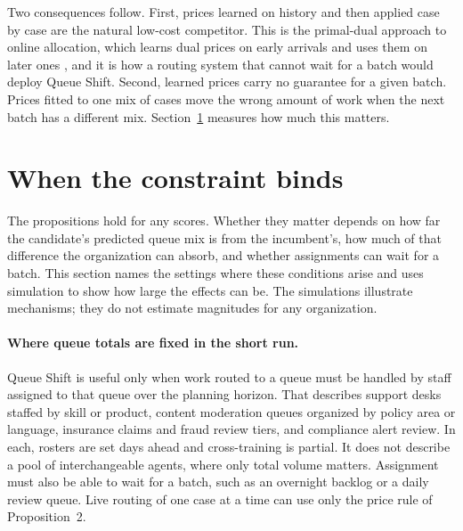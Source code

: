 \documentclass[11pt]{article}
\begin{document}
Two consequences follow. First, prices learned on history and then applied case by case are the
natural low-cost competitor. This is the primal-dual approach to online allocation, which learns
dual prices on early arrivals and uses them on later ones \citep{devanur2009adwords,agrawal2014online},
and it is how a routing system that cannot wait for a batch would deploy Queue Shift. Second,
learned prices carry no guarantee for a given batch. Prices fitted to one mix of cases move the
wrong amount of work when the next batch has a different mix. Section~\ref{sec:regimes} measures
how much this matters.

\section{When the constraint binds}
\label{sec:regimes}

The propositions hold for any scores. Whether they matter depends on how far the candidate's
predicted queue mix is from the incumbent's, how much of that difference the organization can
absorb, and whether assignments can wait for a batch. This section names the settings where these
conditions arise and uses simulation to show how large the effects can be. The simulations
illustrate mechanisms; they do not estimate magnitudes for any organization.

\paragraph{Where queue totals are fixed in the short run.}
Queue Shift is useful only when work routed to a queue must be handled by staff assigned to that
queue over the planning horizon. That describes support desks staffed by skill or product, content
moderation queues organized by policy area or language, insurance claims and fraud review tiers,
and compliance alert review. In each, rosters are set days ahead and cross-training is partial. It
does not describe a pool of interchangeable agents, where only total volume matters. Assignment
must also be able to wait for a batch, such as an overnight backlog or a daily review queue. Live
routing of one case at a time can use only the price rule of Proposition~2.
\end{document}
